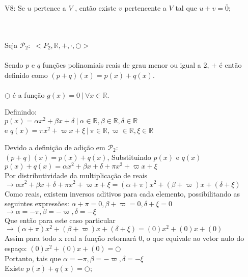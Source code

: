 \documentclass[12pt, twoside, a4]{article} %
\begin{document}
\begin{large}
    \begin{bf}
        V8: Se $u$ pertence a $V$ , então existe $v$ pertencente a $V$ tal que
        $u + v = \overline{0}$;
    \end{bf} 
\end{large} \\ \\
Seja $\mathcal{P}_2 :$
$<P_2, \mathbb{R}, +, \cdot, \bigcirc >$ \\ \\
Sendo $p$ e $q$ funções polinomiais reais de grau menor ou igual a 2, $+$ é então definido como $(p + q)(x) = p(x) + q(x)$. \\ \\
$\bigcirc$ é a função $ g(x) = 0 ~ | ~ \forall x \in \mathbb{R} $. \\
\begin{center}
    

    Definindo: \\  $p(x) = \alpha x^2 + \beta x + \delta ~ | ~ \alpha \in \mathbb{R}, \beta \in \mathbb{R}, \delta \in \mathbb{R}$ \\
   e $q(x) = \pi x^2 + \varpi  x + \xi  ~ | ~ \pi \in \mathbb{R}, \varpi  \in \mathbb{R}, \xi  \in \mathbb{R}$

    \begin{doublespacing}

        Devido a definição de adição em $\mathcal{P}_2 :$ \\
        $(p + q)(x) = p(x) + q(x)$, Substituindo $p(x)$ e $q(x)$ \\

       $p(x) + q(x) = \alpha x^2 + \beta x + \delta + \pi x^2 + \varpi  x + \xi $ \\
        Por distributividade da multiplicação de reais
        $\to \alpha x^2 + \beta x + \delta + \pi x^2 + \varpi  x + \xi = (\alpha + \pi)x^2 + (\beta + \varpi)x + (\delta + \xi)$ \\
        Como reais, existem inversos aditivos para cada elemento, possibilitando as seguintes expressões:
        $ \alpha + \pi = 0 , \beta + \varpi = 0, \delta + \xi = 0$ \\
        $\to \alpha = -\pi , \beta = - \varpi, \delta = - \xi$ \\
        Que então para este caso particular \\
        $\to (\alpha + \pi)x^2 + (\beta + \varpi)x + (\delta + \xi) = (0)x^2 + (0)x + (0)$ \\
        Assim para todo x real a função retornará 0, o que equivale ao vetor nulo do espaço: 
        $(0)x^2 + (0)x + (0) = \bigcirc$ \\ 
        Portanto, tais que $\alpha = -\pi , \beta = - \varpi, \delta = - \xi$ \\
        Existe  $p(x) + q(x) = \bigcirc$;
    \end{doublespacing}
\end{center}
\end{document}
